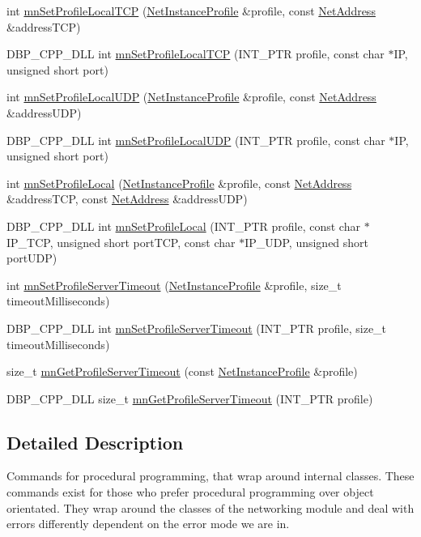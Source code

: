 \begin{DoxyCompactItemize}
\item 
int \hyperlink{group__proc_commands_gab19e44812fe755a8e6053b1dcddfd7e1}{mnSetProfileLocalTCP} (\hyperlink{class_net_instance_profile}{NetInstanceProfile} \&profile, const \hyperlink{class_net_address}{NetAddress} \&addressTCP)
\item 
DBP\_\-CPP\_\-DLL int \hyperlink{group__proc_commands_gaf336a7eca486dfee88ef138d8a161c8b}{mnSetProfileLocalTCP} (INT\_\-PTR profile, const char $\ast$IP, unsigned short port)
\item 
int \hyperlink{group__proc_commands_ga9440ec7413085fac31407237d3734497}{mnSetProfileLocalUDP} (\hyperlink{class_net_instance_profile}{NetInstanceProfile} \&profile, const \hyperlink{class_net_address}{NetAddress} \&addressUDP)
\item 
DBP\_\-CPP\_\-DLL int \hyperlink{group__proc_commands_ga4f28d6098ff285f4ca6f3227062927db}{mnSetProfileLocalUDP} (INT\_\-PTR profile, const char $\ast$IP, unsigned short port)
\item 
int \hyperlink{group__proc_commands_ga8aa562c858adb07d9b9b54fe8467ea7c}{mnSetProfileLocal} (\hyperlink{class_net_instance_profile}{NetInstanceProfile} \&profile, const \hyperlink{class_net_address}{NetAddress} \&addressTCP, const \hyperlink{class_net_address}{NetAddress} \&addressUDP)
\item 
DBP\_\-CPP\_\-DLL int \hyperlink{group__proc_commands_gab8b04864e29fdee69b6bae6a25f247dc}{mnSetProfileLocal} (INT\_\-PTR profile, const char $\ast$IP\_\-TCP, unsigned short portTCP, const char $\ast$IP\_\-UDP, unsigned short portUDP)
\item 
int \hyperlink{group__proc_commands_ga91b33a4ec5298a27187a018a464722f1}{mnSetProfileServerTimeout} (\hyperlink{class_net_instance_profile}{NetInstanceProfile} \&profile, size\_\-t timeoutMilliseconds)
\item 
DBP\_\-CPP\_\-DLL int \hyperlink{group__proc_commands_ga1caaa732468a1a40d823851a648056ab}{mnSetProfileServerTimeout} (INT\_\-PTR profile, size\_\-t timeoutMilliseconds)
\item 
size\_\-t \hyperlink{group__proc_commands_gaaee155f47891b8d9bf13bb762573d6d0}{mnGetProfileServerTimeout} (const \hyperlink{class_net_instance_profile}{NetInstanceProfile} \&profile)
\item 
DBP\_\-CPP\_\-DLL size\_\-t \hyperlink{group__proc_commands_ga83695176c1d0aea9a853a39497471a29}{mnGetProfileServerTimeout} (INT\_\-PTR profile)
\end{DoxyCompactItemize}


\subsection{Detailed Description}
Commands for procedural programming, that wrap around internal classes. These commands exist for those who prefer procedural programming over object orientated. They wrap around the classes of the networking module and deal with errors differently dependent on the error mode we are in. 

